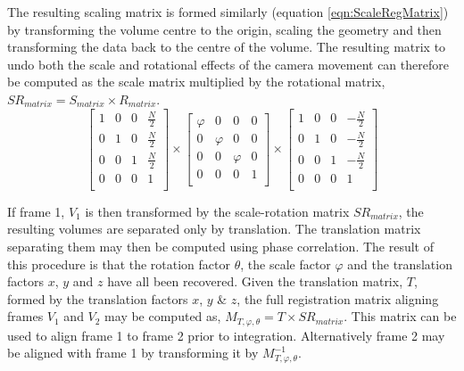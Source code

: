 The resulting scaling matrix is formed similarly (equation \ref{eqn:ScaleRegMatrix}) by transforming the volume centre to the origin, scaling the geometry and then transforming the data back to the centre of the volume. The resulting matrix to undo both the scale and rotational effects of the camera movement can therefore be computed as the scale matrix multiplied by the rotational matrix, $SR_{matrix} = S_{matrix} \times R_{matrix}$. \\

\begin{equation} \label{eqn:ScaleRegMatrix}
\left[
\begin{array}{cccc}
1 & 0 & 0 & \frac{N}{2} \\
0 & 1 & 0 & \frac{N}{2} \\
0 & 0 & 1 & \frac{N}{2} \\
0 & 0 & 0 & 1 \\
\end{array}
\right] \times
\left[
\begin{array}{cccc}
\varphi & 0 & 0 & 0 \\
0 & \varphi & 0 & 0 \\
0 & 0 & \varphi & 0 \\
0 & 0 & 0 & 1 \\
\end{array}
\right] \times
\left[
\begin{array}{cccc}
1 & 0 & 0 & -\frac{N}{2} \\
0 & 1 & 0 & -\frac{N}{2} \\
0 & 0 & 1 & -\frac{N}{2} \\
0 & 0 & 0 & 1 \\
\end{array}
\right]
\end{equation}

If frame 1, $V_1$ is then transformed by the scale-rotation matrix $SR_{matrix}$, the resulting volumes are separated only by translation. The translation matrix separating them may then be computed using phase correlation. The result of this procedure is that the rotation factor $\theta$, the scale factor $\varphi$ and the translation factors $x$, $y$ and $z$ have all been recovered. Given the translation matrix, $T$, formed by the translation factors $x$, $y$ \& $z$, the full registration matrix aligning frames $V_1$ and $V_2$ may be computed as, $M_{T,\varphi,\theta} = T \times SR_{matrix}$. This matrix can be used to align frame 1 to frame 2 prior to integration. Alternatively frame 2 may be aligned with frame 1 by transforming it by $M_{T,\varphi,\theta}^{-1}$. \\

